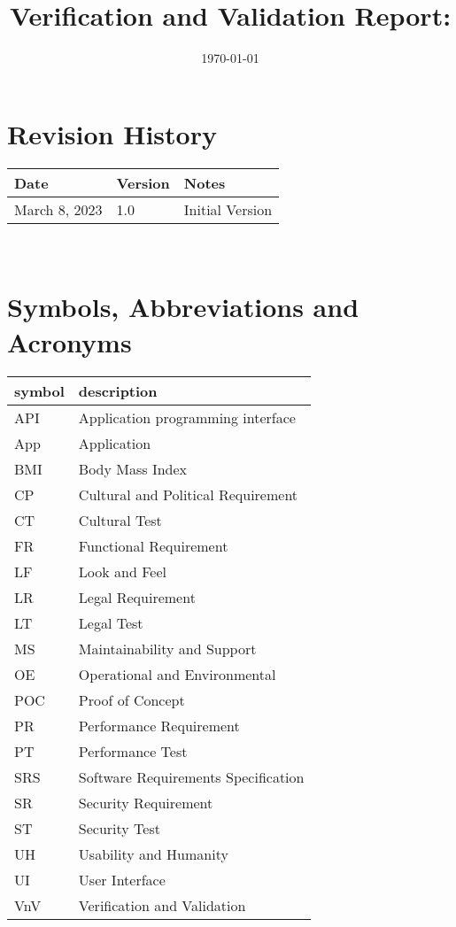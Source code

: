 \documentclass[12pt, titlepage]{article}
\begin{document}
	
	\title{Verification and Validation Report: \progname} 
	\author{\authname}
	\date{\today}
	
	\maketitle
	
	
	\section{Revision History}
	
	\begin{tabularx}{\textwidth}{p{3cm}p{2cm}X}
		\toprule {\bf Date} & {\bf Version} & {\bf Notes}\\
		\midrule
		March 8, 2023 & 1.0 & Initial Version\\
		\bottomrule
	\end{tabularx}
	
	~\newpage
	
	\section{Symbols, Abbreviations and Acronyms}
	
	\renewcommand{\arraystretch}{1.2}
	\begin{tabular}{l l} 
		\toprule		
		\textbf{symbol} & \textbf{description}\\
		\midrule 
		API & Application programming interface\\
		App & Application\\
		BMI & Body Mass Index\\
		CP & Cultural and Political Requirement\\
		CT & Cultural Test\\
		FR & Functional Requirement\\
		LF & Look and Feel\\
		LR & Legal Requirement\\
		LT & Legal Test\\
		MS & Maintainability and Support\\
		OE & Operational and Environmental\\
		POC & Proof of Concept\\
		PR& Performance Requirement\\
		PT& Performance Test\\
		SRS & Software Requirements Specification\\
		SR & Security Requirement\\
		ST & Security Test\\
		UH & Usability and Humanity\\
		UI & User Interface\\
		VnV & Verification and Validation\\
		\bottomrule
	\end{tabular}\\
	
\end{document}
